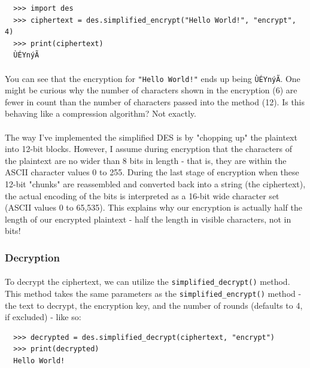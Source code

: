 \documentclass[12pt,a4paper]{article}
\begin{document}
\begin{verbatim}
  >>> import des
  >>> ciphertext = des.simplified_encrypt("Hello World!", "encrypt", 4)
  >>> print(ciphertext)
  ÙÉYnýÃ
\end{verbatim}

\paragraph{}
You can see that the encryption for \verb|"Hello World!"| ends up being 
\verb|ÙÉYnýÃ|.  One might be curious why the number of characters shown in 
the encryption (6) are fewer in count than the number of characters passed into the 
method (12).  Is this behaving like a compression algorithm?  Not exactly.

\paragraph{}
The way I've implemented the simplified DES is by "chopping up" the plaintext 
into 12-bit blocks.  However, I assume during encryption that the characters of the 
plaintext are no wider than 8 bits in length - that is, they are within the 
ASCII character values 0 to 255.  During the last stage of encryption when these 
12-bit "chunks" are reassembled and converted back into a string (the ciphertext), 
the actual encoding of the bits is interpreted as a 16-bit wide character set 
(ASCII values 0 to 65,535).  This explains why our encryption is actually half 
the length of our encrypted plaintext - half the length in visible characters, 
not in bits!

\subsubsection{Decryption}
\paragraph{}
To decrypt the ciphertext, we can utilize the \verb|simplified_decrypt()| 
method.  This method takes the same parameters as the 
\verb|simplified_encrypt()| method - the text to decrypt, the encryption key, 
and the number of rounds (defaults to 4, if excluded) - like so:

\begin{verbatim}
  >>> decrypted = des.simplified_decrypt(ciphertext, "encrypt")
  >>> print(decrypted)
  Hello World!
\end{verbatim}
\end{document}
